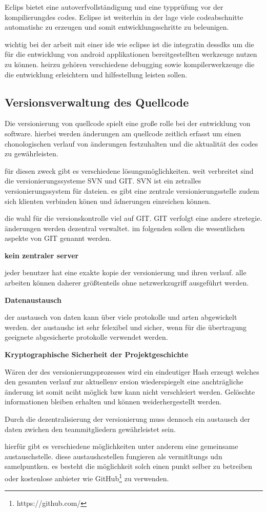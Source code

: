 Eclips bietet eine autoverfvollständigung und eine typprüfung vor der kompilierungdes codes. Eclipse ist weiterhin in der lage viele codeabschnitte automatishc zu erzeugen und somit entwicklungsschritte zu beleunigen.

wichtig bei der arbeit mit einer ide wie eclipse ist die integratin dessdks um die für die entwicklung von android applikationen bereitgestellten werkzeuge nutzen zu können. heirzu gehören verschiedene debugging sowie kompilerwerkzeuge die die entwicklung erleichtern und hilfestellung leisten sollen.

\subsection{Versionsverwaltung des Quellcode}
Die versionierung von quellcode spielt eine große rolle bei der entwicklung von software. hierbei werden änderungen am quellcode zeitlich erfasst um einen chonologischen verlauf von änderungen festzuhalten und die aktualität des codes zu gewährleisten.

für diesen zweck gibt es verschiedene lösungsmöglichkeiten. weit verbreitet sind die versionierungssysteme SVN und GIT.
SVN ist ein zetralles versionierungssystem für dateien.  es gibt eine zentrale versionierungsstelle zudem sich klienten verbinden könen und ädnerungen einreichen können.

die wahl für die versionskontrolle viel auf GIT. GIT verfolgt eine andere stretegie. änderungen werden dezentral verwaltet. im folgenden sollen die wesentlichen aspekte von GIT genannt werden.

\textbf{kein zentraler server}

jeder benutzer hat eine exakte kopie der versionierung und ihren verlauf. alle arbeiten können daherer größtenteils ohne netzwerkzugriff ausgeführt werden.

\textbf{Datenaustausch}

der austausch von daten kann über viele protokolle und arten abgewickelt werden. der austaushc ist sehr felexibel und sicher, wenn für die übertragung geeignete abgesicherte protokolle verwendet werden.


\textbf{Kryptographische Sicherheit der Projektgeschichte}

Wären der des versionierungsprozesses wird ein eindeutiger Hash erzeugt welches den gesamten verlauf zur aktuellenv ersion wiederspiegelt eine anchträgliche änderung ist somit nciht möglick bzw kann nicht verschleiert werden. Gelöschte informationen bleiben erhalten und können weiderhergestellt werden.

Durch die dezentralisierung der versionierung muss dennoch ein austausch der daten zwichen den teammitgliedern gewährleistet sein.

hierfür gibt es verschiedene möglichkeiten unter anderem eine gemeinsame austauschstelle. diese austaushcstellen fungieren als vermitltungs udn samelpuntken. es besteht die möglichkeit solch einen punkt selber zu betreiben oder kostenlose anbieter wie GitHub\footnote{https://github.com/} zu verwenden.

